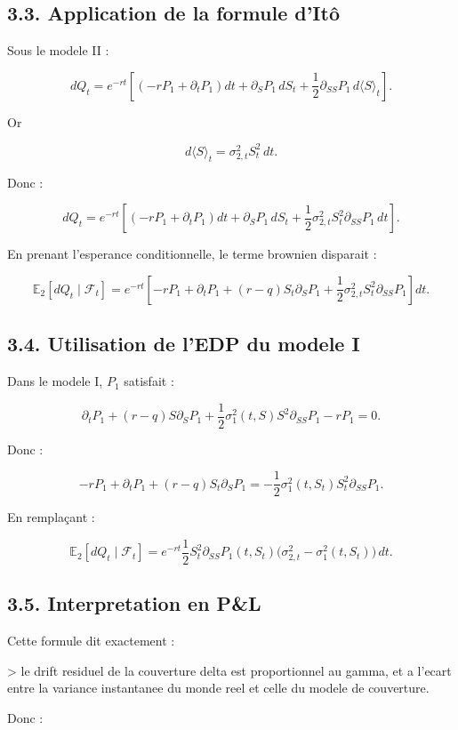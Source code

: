 \documentclass[11pt,a4paper]{article}
\begin{document}
\subsection{3.3. Application de la formule d'Itô}

Sous le modele II :

\[
dQ_t
=
e^{-rt}
\left[
\left(-rP_1+\partial_t P_1\right)dt
+
\partial_S P_1\,dS_t
+
\frac12 \partial_{SS}P_1\,d\langle S\rangle_t
\right].
\]

Or

\[
d\langle S\rangle_t=\sigma_{2,t}^2S_t^2\,dt.
\]

Donc :

\[
dQ_t
=
e^{-rt}
\left[
\left(-rP_1+\partial_t P_1\right)dt
+
\partial_S P_1\,dS_t
+
\frac12 \sigma_{2,t}^2S_t^2\partial_{SS}P_1\,dt
\right].
\]

En prenant l'esperance conditionnelle, le terme brownien disparait :

\[
\mathbb E_2[dQ_t\mid\mathcal F_t]
=
e^{-rt}
\left[
-rP_1+\partial_t P_1+(r-q)S_t\partial_S P_1+\frac12 \sigma_{2,t}^2S_t^2\partial_{SS}P_1
\right]dt.
\]

\subsection{3.4. Utilisation de l'EDP du modele I}

Dans le modele I, \(P_1\) satisfait :

\[
\partial_t P_1+(r-q)S\partial_S P_1+\frac12 \sigma_1^2(t,S)S^2\partial_{SS}P_1-rP_1=0.
\]

Donc :

\[
-rP_1+\partial_t P_1+(r-q)S_t\partial_S P_1
=
-\frac12 \sigma_1^2(t,S_t)S_t^2\partial_{SS}P_1.
\]

En remplaçant :

\[
\mathbb E_2[dQ_t\mid\mathcal F_t]
=
e^{-rt}\frac12 S_t^2\partial_{SS}P_1(t,S_t)\big(\sigma_{2,t}^2-\sigma_1^2(t,S_t)\big)\,dt.
\]

\subsection{3.5. Interpretation en P\&L}

Cette formule dit exactement :

> le drift residuel de la couverture delta est proportionnel au gamma, et a l'ecart entre la variance instantanee du monde reel et celle du modele de couverture.

Donc :
\end{document}
